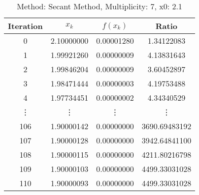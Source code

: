 \begin{table}
\centering
\caption{Method: Secant Method, Multiplicity: 7, x0: 2.1}
\label{tab:table_Secant_Method_7_2_1}
\begin{tabular}{c c c c}
\toprule
Iteration &      $x_k$ &   $f(x_k)$ &         Ratio \\
\midrule
        0 & 2.10000000 & 0.00001280 &    1.34122083 \\
        1 & 1.99921260 & 0.00000009 &    4.13831643 \\
        2 & 1.99846204 & 0.00000009 &    3.60452897 \\
        3 & 1.98471444 & 0.00000003 &    4.19753488 \\
        4 & 1.97734451 & 0.00000002 &    4.34340529 \\
   \vdots &     \vdots &     \vdots &        \vdots \\
      106 & 1.90000142 & 0.00000000 & 3690.69483192 \\
      107 & 1.90000128 & 0.00000000 & 3942.64841100 \\
      108 & 1.90000115 & 0.00000000 & 4211.80216798 \\
      109 & 1.90000103 & 0.00000000 & 4499.33031028 \\
      110 & 1.90000093 & 0.00000000 & 4499.33031028 \\
\bottomrule
\end{tabular}
\end{table}
